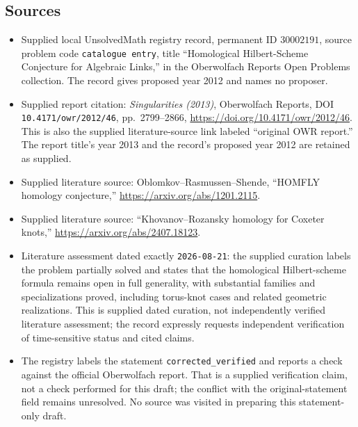 \documentclass[11pt]{article}
\begin{document}
\subsection{Sources}
\begin{itemize}
\item Supplied local UnsolvedMath registry record, permanent ID \(30002191\), source problem code \texttt{catalogue entry}, title ``Homological Hilbert-Scheme Conjecture for Algebraic Links,'' in the Oberwolfach Reports Open Problems collection. The record gives proposed year 2012 and names no proposer.
\item Supplied report citation: \emph{Singularities (2013)}, Oberwolfach Reports, DOI \texttt{10.4171/owr/2012/46}, pp.\ 2799--2866, \url{https://doi.org/10.4171/owr/2012/46}. This is also the supplied literature-source link labeled ``original OWR report.'' The report title's year 2013 and the record's proposed year 2012 are retained as supplied.
\item Supplied literature source: Oblomkov--Rasmussen--Shende, ``HOMFLY homology conjecture,'' \url{https://arxiv.org/abs/1201.2115}.
\item Supplied literature source: ``Khovanov--Rozansky homology for Coxeter knots,'' \url{https://arxiv.org/abs/2407.18123}.
\item Literature assessment dated exactly \texttt{2026-08-21}: the supplied curation labels the problem partially solved and states that the homological Hilbert-scheme formula remains open in full generality, with substantial families and specializations proved, including torus-knot cases and related geometric realizations. This is supplied dated curation, not independently verified literature assessment; the record expressly requests independent verification of time-sensitive status and cited claims.
\item The registry labels the statement \texttt{corrected\_verified} and reports a check against the official Oberwolfach report. That is a supplied verification claim, not a check performed for this draft; the conflict with the original-statement field remains unresolved. No source was visited in preparing this statement-only draft.
\end{itemize}
\end{document}
